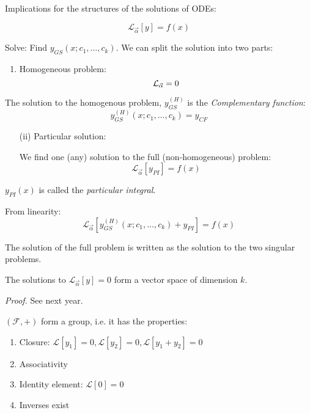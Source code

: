 \documentclass[10pt]{scrartcl}
\begin{document}
Implications for the structures of the solutions of ODEs:

\[\mathcal{L}_{\vec{\alpha}}[y] = f(x)\]

Solve: Find $y_{GS}(x; c_1,\dots,c_k)$. We can split the solution into two parts: 

\begin{enumerate}
  \item Homogeneous problem: 
  \[\mathcal{L}_{\vec{\alpha}} = 0\vspace*{-5pt}\]
    \end{enumerate}\vspace*{5pt}
    
    \begin{definition}
  The solution to the homogenous problem, $y_{GS}^{(H)}$ is the \emph{Complementary function}: 	
    \[y_{GS}^{(H)}(x;c_1,\dots,c_k) = y_{CF}\]
  \end{definition}\vspace*{5pt}


\begin{enumerate}
  \item[(ii)] Particular solution: 
  
  We find one (any) solution to the full (non-homogeneous) problem:
    \[\mathcal{L}_{\vec{\alpha}}[y_{PI}] = f(x)\]
    
\end{enumerate}  

    
\begin{definition}
  $y_{PI}(x)$ is called the \emph{particular integral}.
  \end{definition}
 
  From linearity: 
  \[\mathcal{L}_{\vec{\alpha}}[y_{GS}^{(H)}(x;c_1,\dots,c_k)+y_{PI}] = f(x)\]
  
  The solution of the full problem is written as the solution to the two singular problems. 

\begin{theorem}
The solutions to $\mathcal{L}_{\vec{\alpha}}[y]=0$ form a vector space of dimension $k$. 	
\end{theorem}
\textit{Proof.} See next year. 

$(\mathcal{F}, +)$ form a group, i.e. it has the properties:
\begin{enumerate}
  \item Closure: $\mathcal{L}[y_1] = 0, \mathcal{L}[y_2] = 0, \mathcal{L}[y_1 + y_2] = 0$
  \item Associativity
  \item Identity element: $\mathcal{L}[0] = 0$
  \item Inverses exist
\end{enumerate}
\end{document}
